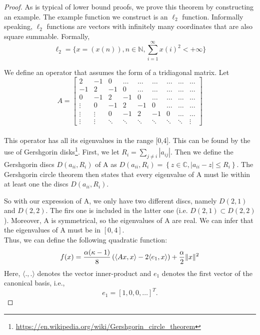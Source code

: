 \documentclass{article}
\begin{document}
\begin{proof}

As is typical of lower bound proofs, we prove this theorem by constructing an example. The example function we construct is an $\ell_2$ function. Informally speaking, $\ell_2$ functions are vectors with infinitely many coordinates that are also square summable. Formally, 
	\[\ell_2 = \{ x = (x(n)), n \in \mathbb{N}, \sum_{i=1}^{\infty} x(i)^2 < +\infty \}\]
    
We define an operator that assumes the form of a tridiagonal matrix. Let
	\[ A = \left[ \begin{matrix} 2 & -1 & 0 & \dots & \dots & \dots & \dots & \dots & \dots \\ -1 & 2 & -1 & 0 & \dots & \dots & \dots & \dots & \dots \\ 0 & -1 & 2 & -1 & 0 & \dots & \dots & \dots & \dots \\ \vdots & 0 & -1 & 2 & -1 & 0 & \dots & \dots & \dots \\ \vdots & \vdots & 0 & -1 & 2 & -1 & 0 & \dots & \dots \\ \vdots & \vdots & \ddots & \ddots & \ddots & \ddots & \ddots & \ddots & \vdots  \end{matrix} \right] \] \\
    
This operator has all its eigenvalues in the range [0,4].  This can be found by the use of Gershgorin disks\footnote{\url{https://en.wikipedia.org/wiki/Gershgorin_circle_theorem}}. First, we let $R_i = \sum_{j \neq i} |a_{ij}|$. Then we define the Gershgorin discs $D(a_{ii},R_i)$ of A as $D(a_{ii},R_{i}) = \left\{z\in {\mathbb  {C}},|a_{{ii}}-z|\leq R_i\right\}$. The Gershgorin circle theorem \cite{Ger31} then states that every eigenvalue of A must lie within at least one the discs $D(a_{ii},R_i)$.

So with our expression of A, we only have two different discs, namely $D(2,1)$ and $D(2,2)$. The firs one is included in the latter one (i.e. $D(2,1) \subset D(2,2)$). Moreover, A is symmetrical, so the eigenvalues of A are real. We can infer that the eigenvalues of A must be in $[0,4]$.\\

Thus, we can define the following quadratic function:
	\[f(x) = {\alpha(\kappa-1) \over 8} \left( \langle Ax,x\rangle - 2\langle e_1,x \rangle \right) + {\alpha \over 2} \|x\|^2\]
	Here, $\langle .,. \rangle$ denotes the vector inner-product and $e_1$ denotes the first vector of the canonical basis, i.e., \[e_1 = \left[ 1,0,0, \dots \right]^T.\]
    

\end{proof}
\end{document}
